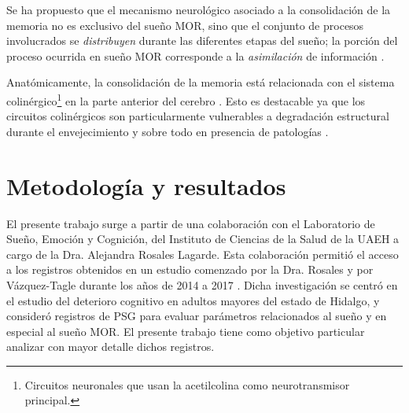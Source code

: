 \documentclass[12pt,letterpaper]{book}
\begin{document}
Se ha propuesto que el mecanismo neurológico asociado a la consolidación de la memoria no es exclusivo del sueño MOR, sino que el conjunto de procesos involucrados se \textit{distribuyen} durante las diferentes etapas del sueño; la porción del proceso ocurrida en sueño MOR corresponde a la \textit{asimilación} de información \cite{diekelmann10}.

Anatómicamente, la consolidación de la memoria está relacionada con el sistema colinérgico\footnote{Circuitos neuronales que usan la acetilcolina como neurotransmisor principal.} en la parte anterior del cerebro \cite{Blake}.
%
Esto es destacable ya que los circuitos colinérgicos son particularmente vulnerables a degradación estructural durante el envejecimiento y sobre todo en presencia de patologías \cite{Schliebs11}.

%


\chapter{Metodología y resultados}
\label{ch:metodologia}

El presente trabajo surge a partir de una colaboración con el Laboratorio de Sueño, Emoción y Cognición, del Instituto de Ciencias de la Salud de la UAEH a cargo de la Dra. Alejandra Rosales Lagarde.
%
Esta colaboración permitió el acceso a los registros obtenidos en un estudio comenzado por la Dra. Rosales y por Vázquez-Tagle durante los años de 2014 a 2017 \cite{VazquezTagle16}. 
%
Dicha investigación se centró en el estudio del deterioro cognitivo en adultos mayores del estado de Hidalgo, y consideró registros de PSG para evaluar parámetros relacionados al sueño y en especial al sueño MOR.
%
El presente trabajo tiene como objetivo particular analizar con mayor detalle dichos registros.
\end{document}
